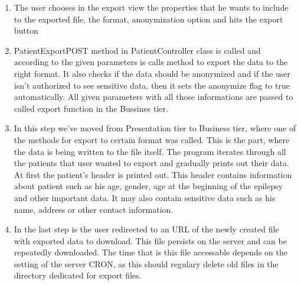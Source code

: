 \documentclass[thesis=B,english]{FITthesis}[2012/10/20]
\begin{document}
\begin{enumerate}
\item{ The user chooses in the export view the properties that he wants to include to the exported file, the format, anonymization option and hits the export button }
\item{ PatientExportPOST method in PatientController class is called and according to the given parameters is calls method to export the data to the right format. It also checks if the data should be anonymized and if the user isn't authorized to see sensitive data, then it sets the anonymize flag to true automatically. All given parameters with all those informations are passed to called export function in the Bussines tier.}
\item{ In this step we've moved from Presentation tier to Business tier, where one of the methods for export to certain format was called. This is the part, where the data is being written to the file itself. The program iterates through all the patients that user wanted to export and gradually prints out their data.}
At first the patient's header is printed out. This header contains information about patient such as his age, gender, age at the beginning of the epilepsy and other important data. It may also contain sensitive data such as his name, address or other contact information.
\item{ In the last step is the user redirected to an URL of the newly created file with exported data to download. This file persists on the server and can be repeatedly downloaded. The time that is this file accessable depends on the setting of the server CRON, as this should regulary delete old files in the directory dedicated for export files.}

\end{enumerate}
\end{document}
